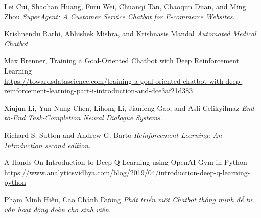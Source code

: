 \begin{thebibliography}{99}

Lei Cui, Shaohan Huang, Furu Wei, Chuanqi Tan, Chaoqun Duan, and Ming Zhou
\textit{SuperAgent: A Customer Service Chatbot for E-commerce Websites}. 

Krishnendu Rarhi, Abhishek Mishra, and Krishnasis Mandal
\textit{Automated Medical Chatbot}.

Max Brenner, Training a Goal-Oriented Chatbot with Deep Reinforcement Learning
\\\url{https://towardsdatascience.com/training-a-goal-oriented-chatbot-with-deep-reinforcement-learning-part-i-introduction-and-dce3af21d383}

Xiujun Li, Yun-Nung Chen, Lihong Li, Jianfeng Gao, and Asli Celikyilmaz
\textit{End-to-End Task-Completion Neural Dialogue Systems}.

Richard S. Sutton and Andrew G. Barto
\textit{Reinforcement Learning: An Introduction second edition}.

A Hands-On Introduction to Deep Q-Learning using OpenAI Gym in Python
\\\url{https://www.analyticsvidhya.com/blog/2019/04/introduction-deep-q-learning-python}

Phạm Minh Hiếu, Cao Chánh Dương
\textit{Phát triển một Chatbot thông minh để tư vấn hoạt động đoàn cho sinh viên}.

\end{thebibliography}